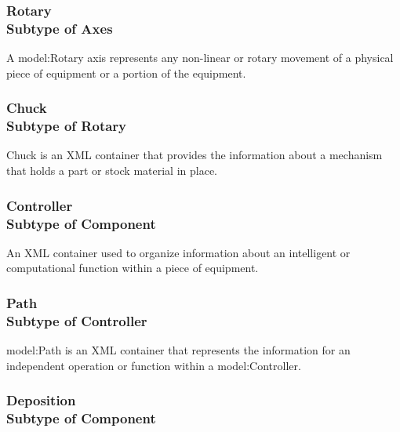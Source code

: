 \FloatBarrier
\subsubsection[Rotary]{Rotary \\ {\small Subtype of Axes}}
  \label{type:Rotary}

\FloatBarrier

A {model:Rotary} axis represents any non-linear or rotary movement of a physical piece of equipment or a portion of the equipment.

\FloatBarrier
\subsubsection[Chuck]{Chuck \\ {\small Subtype of Rotary}}
  \label{type:Chuck}

\FloatBarrier

Chuck is an XML container that provides the information about a mechanism that holds a part or stock material in place.

\FloatBarrier
\subsubsection[Controller]{Controller \\ {\small Subtype of Component}}
  \label{type:Controller}

\FloatBarrier

An XML container used to organize information about an intelligent or computational function within a piece of equipment.

\FloatBarrier
\subsubsection[Path]{Path \\ {\small Subtype of Controller}}
  \label{type:Path}

\FloatBarrier

{model:Path} is an XML container that represents the information for an independent operation or function within a {model:Controller}.

\FloatBarrier
\subsubsection[Deposition]{Deposition \\ {\small Subtype of Component}}
  \label{type:Deposition}

